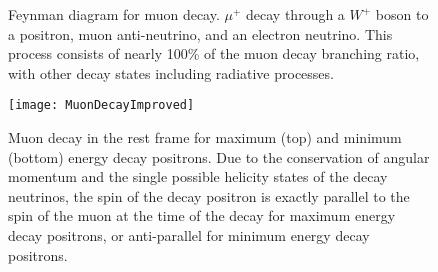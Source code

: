 \begin{figure}[]
\centering
\caption[Feynman diagram for muon decay]{Feynman diagram for muon decay. $\mu^{+}$ decay through a $W^{+}$ boson to a positron, muon anti-neutrino, and an electron neutrino. This process consists of nearly 100\% of the muon decay branching ratio, with other decay states including radiative processes.}
\label{fig:mudecay}
\end{figure}



\begin{figure}[]
    \centering
    \texttt{[image: MuonDecayImproved]}
    \caption[Muon decay for maximum and minimum energy decay positrons]{Muon decay in the rest frame for maximum (top) and minimum (bottom) energy decay positrons. Due to the conservation of angular momentum and the single possible helicity states of the decay neutrinos, the spin of the decay positron is exactly parallel to the spin of the muon at the time of the decay for maximum energy decay positrons, or anti-parallel for minimum energy decay positrons.}
    \label{fig:MuonDecayImproved}
\end{figure}


